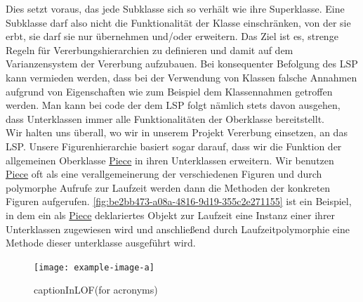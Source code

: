 \documentclass[
10pt, %
a4paper, %
oneside, %
headinclude,footinclude, %
BCOR5mm, %
]{scrartcl}
\begin{document}
\begin{onehalfspace}
Dies setzt voraus, das jede Subklasse sich so verhält wie ihre Superklasse. Eine Subklasse darf also nicht die Funktionalität der Klasse einschränken, von der sie erbt, sie darf sie nur übernehmen und/oder erweitern. Das Ziel ist es, strenge Regeln für Vererbungshierarchien zu definieren und damit auf dem Varianzensystem der Vererbung aufzubauen. Bei konsequenter Befolgung des LSP kann vermieden werden, dass bei der Verwendung von Klassen falsche Annahmen aufgrund von Eigenschaften wie zum Beispiel dem Klassennahmen getroffen werden. Man kann bei code der dem LSP folgt nämlich stets davon ausgehen, dass Unterklassen immer alle Funktionalitäten der Oberklasse bereitstellt.
\\
Wir halten uns überall, wo wir in unserem Projekt Vererbung einsetzen, an das LSP. Unsere Figurenhierarchie basiert sogar darauf, dass wir die Funktion der allgemeinen Oberklasse \href{https://github.com/schmida736/Chess-AdvancedSE/blob/main/Chess-AdvancedSE/Game\%20Elements/Pieces/Piece.cs}{Piece} in ihren Unterklassen erweitern. Wir benutzen \href{https://github.com/schmida736/Chess-AdvancedSE/blob/main/Chess-AdvancedSE/Game\%20Elements/Pieces/Piece.cs}{Piece} oft als eine verallgemeinerung der verschiedenen Figuren und durch polymorphe Aufrufe zur Laufzeit werden dann die Methoden der konkreten Figuren aufgerufen. \autoref{fig:be2bb473-a08a-4816-9d19-355c2e271155} ist ein Beispiel, in dem ein als \href{https://github.com/schmida736/Chess-AdvancedSE/blob/main/Chess-AdvancedSE/Game\%20Elements/Pieces/Piece.cs}{Piece} deklariertes Objekt zur Laufzeit eine Instanz einer ihrer Unterklassen zugewiesen wird und anschließend durch Laufzeitpolymorphie eine Methode dieser unterklasse ausgeführt wird.

\begin{figure}[ht]
	\texttt{[image: example-image-a]}
	\caption[captionInLOF(for acronyms)]{captionInLOF(for acronyms)}
	\label{fig:be2bb473-a08a-4816-9d19-355c2e271155}
\end{figure}


\end{onehalfspace}
\end{document}
